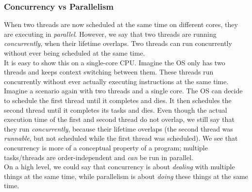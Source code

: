 \documentclass[main]{subfiles}
\begin{document}
\subsubsection{Concurrency vs Parallelism}
When two threads are now scheduled at the same time on different cores, they are executing in \textit{parallel}. However, we say that two threads are running \textit{concurrently}, when their lifetime overlaps. Two threads can run concurrently without ever being scheduled at the same time.\\
It is easy to show this on a single-core CPU. Imagine the OS only has two threads and keeps context switching between them. These threads run concurrently without ever actually executing instructions at the same time.\\[3mm]
Imagine a scenario again with two threads and a single core. The OS can decide to schedule the first thread until it completes and dies. It then schedules the second thread until it completes its tasks and dies. Even though the actual execution time of the first and second thread do not overlap, we still say that they run \textit{concurrently}, because their lifetime overlaps (the second thread was \textit{runnable}, but not scheduled while the first thread was scheduled). We see that concurrency is more of a conceptual property of a program; multiple tasks/threads are order-independent and \textit{can} be run in parallel.\\[3mm]
On a high level, we could say that concurrency is about \textit{dealing} with multiple things at the same time, while parallelism is about \textit{doing} these things at the same time.
\end{document}
